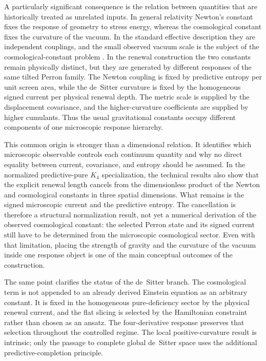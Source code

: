\documentclass[11pt]{article}
\theoremstyle{definition}
\theoremstyle{remark}
\begin{document}
A particularly significant consequence is the relation between quantities that are historically treated as unrelated inputs.  In general relativity Newton's constant fixes the response of geometry to stress energy, whereas the cosmological constant fixes the curvature of the vacuum.  In the standard effective description they are independent couplings, and the small observed vacuum scale is the subject of the cosmological-constant problem \cite{WeinbergCC}.  In the renewal construction the two constants remain physically distinct, but they are generated by different responses of the same tilted Perron family.  The Newton coupling is fixed by predictive entropy per unit screen area, while the de~Sitter curvature is fixed by the homogeneous signed current per physical renewal depth.  The metric scale is supplied by the displacement covariance, and the higher-curvature coefficients are supplied by higher cumulants.  Thus the usual gravitational constants occupy different components of one microscopic response hierarchy.

This common origin is stronger than a dimensional relation.  It identifies which microscopic observable controls each continuum quantity and why no direct equality between current, covariance, and entropy should be assumed.  In the normalized predictive-pure $K_4$ specialization, the technical results also show that the explicit renewal length cancels from the dimensionless product of the Newton and cosmological constants in three spatial dimensions.  What remains is the signed microscopic current and the predictive entropy.  The cancellation is therefore a structural normalization result, not yet a numerical derivation of the observed cosmological constant: the selected Perron state and its signed current still have to be determined from the microscopic cosmological sector.  Even with that limitation, placing the strength of gravity and the curvature of the vacuum inside one response object is one of the main conceptual outcomes of the construction.

The same point clarifies the status of the de~Sitter branch.  The cosmological term is not appended to an already derived Einstein equation as an arbitrary constant.  It is fixed in the homogeneous pure-deficiency sector by the physical renewal current, and the flat slicing is selected by the Hamiltonian constraint rather than chosen as an ansatz.  The four-derivative response preserves that selection throughout the controlled regime.  The local positive-curvature result is intrinsic; only the passage to complete global de~Sitter space uses the additional predictive-completion principle.
\end{document}
